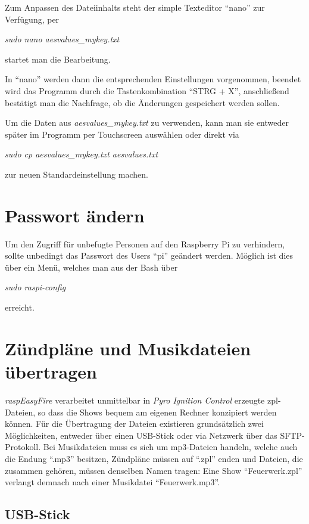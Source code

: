 \documentclass[paper=a4, parskip, numbers=noenddot, toc=listof, headsepline]{scrbook}
\newcommand{\pic}{\emph{Pyro Ignition Control}}
\newcommand{\REF}{\emph{raspEasyFire}}
\begin{document}
			Zum Anpassen des Dateiinhalts steht der simple Texteditor \enquote{nano} zur Verfügung, per
			\begin{center}
				\emph{sudo nano aesvalues\_mykey.txt}
			\end{center}
			startet man die Bearbeitung.

			In \enquote{nano} werden dann die entsprechenden Einstellungen vorgenommen, beendet wird das Programm durch die Tastenkombination \enquote{STRG + X}, anschließend bestätigt man die Nachfrage, ob die Änderungen gespeichert werden sollen.

			Um die Daten aus \emph{aesvalues\_mykey.txt} zu verwenden, kann man sie entweder später im Programm per Touchscreen auswählen oder direkt via
			\begin{center}
				\emph{sudo cp aesvalues\_mykey.txt aesvalues.txt}
			\end{center}
			zur neuen Standardeinstellung machen.

		\section{Passwort ändern}
			Um den Zugriff für unbefugte Personen auf den Raspberry Pi zu verhindern, sollte unbedingt das Passwort des Users \enquote{pi} geändert werden. Möglich ist dies über ein Menü, welches man aus der Bash über
			\begin{center}
				\emph{sudo raspi-config}
			\end{center}
			erreicht.

		\section{Zündpläne und Musikdateien übertragen}
			\REF{} verarbeitet unmittelbar in {\pic} erzeugte zpl-Dateien, so dass die Shows bequem am eigenen Rechner konzipiert werden können. Für die Übertragung der Dateien existieren grundsätzlich zwei Möglichkeiten, entweder über einen USB-Stick oder via Netzwerk über das SFTP-Protokoll. Bei Musikdateien muss es sich um mp3-Dateien handeln, welche auch die Endung \enquote{.mp3} besitzen, Zündpläne müssen auf \enquote{.zpl} enden und Dateien, die zusammen gehören, müssen denselben Namen tragen: Eine Show \enquote{Feuerwerk.zpl} verlangt demnach nach einer Musikdatei \enquote{Feuerwerk.mp3}.

			\subsection{USB-Stick}
\end{document}
